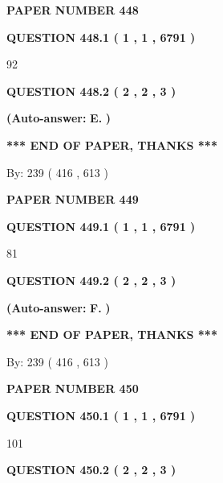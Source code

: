 \documentclass{ctexart}
\begin{document}
   
\newpage 
\setcounter{page}{ 
   448001 } 
   
   
 {\textbf{ \Large{ PAPER NUMBER  448  }}}
   
   
   
   
  
  
{\textbf{\large{QUESTION
448.1 
 ( 1 , 1 , 6791 )
}}}

92
  
  
{\textbf{\large{QUESTION
448.2 
 ( 2 , 2 , 3 )
}}}
 
 
{\textbf{(Auto-answer:}}
{\textbf{\large{
E.}}}
{\textbf{)}}
 
 
   
   
   
   
\vspace{1.0in} 
{\textbf{\large{ *** END OF PAPER, THANKS *** }}} 
   
   
\hspace{1.0in} By: 
 239 ( 416 ,  613 )
   
   
   
   
\newpage 
\setcounter{page}{ 
   449001 } 
   
   
 {\textbf{ \Large{ PAPER NUMBER  449  }}}
   
   
   
   
  
  
{\textbf{\large{QUESTION
449.1 
 ( 1 , 1 , 6791 )
}}}

81
  
  
{\textbf{\large{QUESTION
449.2 
 ( 2 , 2 , 3 )
}}}
 
 
{\textbf{(Auto-answer:}}
{\textbf{\large{
F.}}}
{\textbf{)}}
 
 
   
   
   
   
\vspace{1.0in} 
{\textbf{\large{ *** END OF PAPER, THANKS *** }}} 
   
   
\hspace{1.0in} By: 
 239 ( 416 ,  613 )
   
   
   
   
\newpage 
\setcounter{page}{ 
   450001 } 
   
   
 {\textbf{ \Large{ PAPER NUMBER  450  }}}
   
   
   
   
  
  
{\textbf{\large{QUESTION
450.1 
 ( 1 , 1 , 6791 )
}}}

101
  
  
{\textbf{\large{QUESTION
450.2 
 ( 2 , 2 , 3 )
}}}
 
\end{document}
